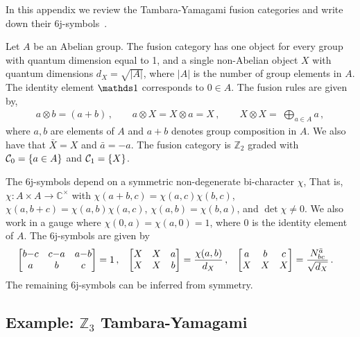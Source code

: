 In this appendix we review the Tambara-Yamagami fusion categories and write down their 6j-symbols~\cite{Tambara1998}.

Let $A$ be an Abelian group. 
The fusion category has one object for every group with quantum dimension equal to 1, and a single non-Abelian object $X$ with quantum dimensions $d_X = \sqrt{|A|}$, where $|A|$ is the number of group elements in $A$.
The identity element $\I$ corresponds to $0 \in A$.
The fusion rules are given by,
\begin{align}
	a \otimes b = (a{+}b) \,, \qquad a \otimes X = X \otimes a = X \,, \qquad X \otimes X = \; \bigoplus_{a \in A} a \,,
\end{align}
where $a,b$ are elements of $A$ and $a+b$ denotes group composition in $A$.
We also have that $\bar{X} = X$ and $\bar{a} = -a$. 
The fusion category is $\mathbb{Z}_2$ graded with $\mathcal{C}_0 = \{a \in A \}$ and $\mathcal{C}_1 = \{ X \}$.

The 6j-symbols depend on a symmetric non-degenerate bi-character $\chi$,
That is, $\chi: A \times A \rightarrow \mathbb{C}^\times$ with $\chi(a+b,c) = \chi(a,c)\chi(b,c)$, $\chi(a,b+c) = \chi(a,b)\chi(a,c)$, $\chi(a,b) = \chi(b,a)$, and $\det \chi \neq 0$. 
We also work in a gauge where $\chi(0,a) = \chi(a,0) = 1$, where 0 is the identity element of $A$.
The 6j-symbols are given by 
\begin{align}
\label{ATY6j}
	\begin{bmatrix} b{-}c & c{-}a & a{-}b \\ a & b & c \end{bmatrix} &= 1 \,,
&	\begin{bmatrix} X & X & a \\ X & X & b \end{bmatrix} &= \frac{ \chi(a,b)}{d_X} \,,
&	\begin{bmatrix} a & b & c \\ X & X & X \end{bmatrix} &= \frac{N_{bc}^{\bar{a}}}{\sqrt{d_X}} \,.
\end{align}
The remaining 6j-symbols can be inferred from symmetry.



\subsection*{Example: \texorpdfstring{$\mathbb{Z}_3$}{Z3} Tambara-Yamagami}

